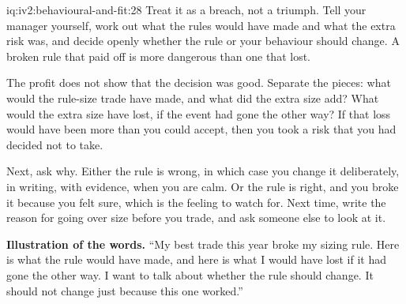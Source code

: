 \begin{solution}{iq:iv2:behavioural-and-fit:28}
Treat it as a breach, not a triumph. Tell your manager yourself, work out what the rules would have made and what the extra risk was, and decide openly whether the rule or your behaviour should change. A broken rule that paid off is more dangerous than one that lost.

The profit does not show that the decision was good. Separate the pieces: what would the rule-size trade have made, and what did the extra size add? What would the extra size have lost, if the event had gone the other way? If that loss would have been more than you could accept, then you took a risk that you had decided not to take.

Next, ask why. Either the rule is wrong, in which case you change it deliberately, in writing, with evidence, when you are calm. Or the rule is right, and you broke it because you felt sure, which is the feeling to watch for. Next time, write the reason for going over size before you trade, and ask someone else to look at it.

\textbf{Illustration of the words.} ``My best trade this year broke my sizing rule. Here is what the rule would have made, and here is what I would have lost if it had gone the other way. I want to talk about whether the rule should change. It should not change just because this one worked.''

\end{solution}


